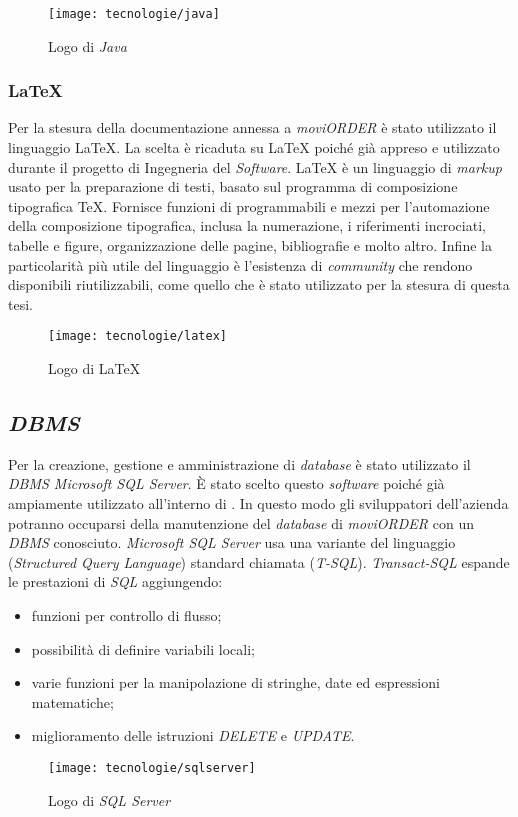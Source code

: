 \begin{figure}[!h] 
    \centering 
    \texttt{[image: tecnologie/java]} 
    \caption{Logo di \textit{Java}}
\end{figure}

\subsubsection{\LaTeX{}}

Per la stesura della documentazione annessa a \textit{moviORDER} è stato utilizzato il linguaggio \LaTeX{}. La scelta è ricaduta su \LaTeX{} poiché già appreso e utilizzato durante il progetto di Ingegneria del \textit{Software}. \LaTeX{} è un linguaggio di \textit{markup} usato per la preparazione di testi, basato sul programma di composizione tipografica \TeX{}. Fornisce funzioni di  programmabili e mezzi per l'automazione della composizione tipografica, inclusa la numerazione, i riferimenti incrociati, tabelle e figure, organizzazione delle pagine, bibliografie e molto altro. Infine la particolarità più utile del linguaggio è l'esistenza di \textit{community} che rendono disponibili  riutilizzabili, come quello che è stato utilizzato per la stesura di questa tesi.

\begin{figure}[!h] 
    \centering 
    \texttt{[image: tecnologie/latex]} 
    \caption{Logo di \LaTeX{}}
\end{figure}

\subsection{\textit{DBMS}}

Per la creazione, gestione e amministrazione di \textit{database} è stato utilizzato il \textit{DBMS Microsoft SQL Server}. È stato scelto questo \textit{software} poiché già ampiamente utilizzato all'interno di \visione{}. In questo modo gli sviluppatori dell'azienda potranno occuparsi della manutenzione del \textit{database} di \textit{moviORDER} con un \textit{DBMS} conosciuto. \textit{Microsoft SQL Server} usa una variante del linguaggio  (\textit{Structured Query Language}) standard chiamata  (\textit{T-SQL}). \textit{Transact-SQL} espande le prestazioni di \textit{SQL} aggiungendo:
\begin{itemize}
	\item funzioni per controllo di flusso;
	\item possibilità di definire variabili locali;
	\item varie funzioni per la manipolazione di stringhe, date ed espressioni matematiche;
	\item miglioramento delle istruzioni \textit{DELETE} e \textit{UPDATE}.
\end{itemize}

\begin{figure}[!h] 
    \centering 
    \texttt{[image: tecnologie/sqlserver]} 
    \caption{Logo di \textit{SQL Server}}
\end{figure}